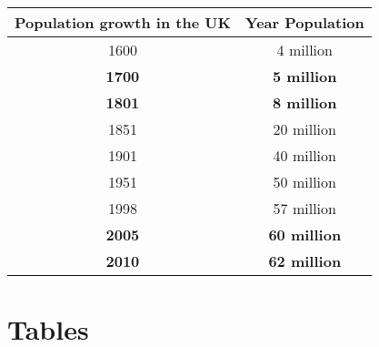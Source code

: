 \documentclass{amsart}
\begin{document}
\begin{table}[h!]
	 \begin{center}
		\begin{tabular}{|c|c|}
		\hline
Population growth in the UK & Year	Population\\
\hline
\hline
1600	&4 million\\
\hline
\textbf{1700}	&\textbf{5 million}\\
\hline
\textbf{1801}	&\textbf{8 million}\\
\hline
1851	&20 million\\
1901	&40 million\\
1951	&50 million\\
1998	&57 million\\
\textbf{2005}	& \textbf{60 million}\\
\textbf{2010}	& \textbf{62 million}\\
\hline
\end{tabular}
\end{center}
\end{table}



\section{Tables}
\end{document}
